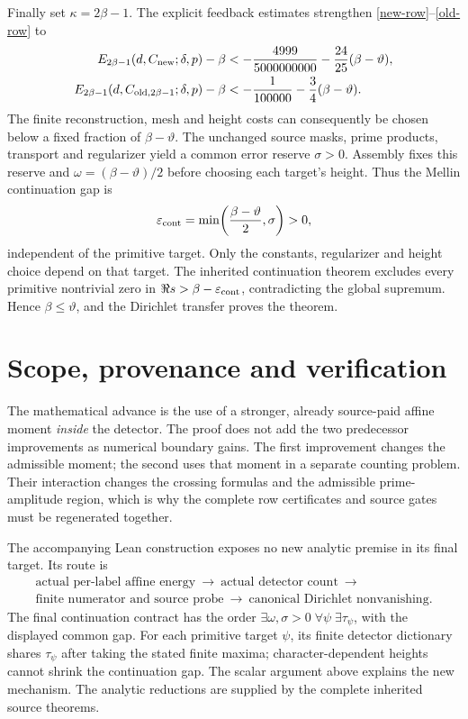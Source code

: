 \documentclass[10pt,a4paper]{article}
\newcommand{\tht}{\vartheta}
\begin{document}
Finally set $\kappa=2\beta-1$. The explicit feedback estimates strengthen
\eqref{new-row}--\eqref{old-row} to
\begin{align*}
 E_{2\beta-1}(d,C_{\rm new};\delta,p)-\beta
 &<-\frac{4999}{5000000000}-\frac{24}{25}(\beta-\tht),\\
 E_{2\beta-1}(d,C_{{\rm old},2\beta-1};\delta,p)-\beta
 &<-\frac1{100000}-\frac34(\beta-\tht).
\end{align*}
The finite reconstruction, mesh and height costs can consequently be
chosen below a fixed fraction of $\beta-\tht$. The unchanged source masks,
prime products, transport and regularizer yield a common error reserve
$\sigma>0$. Assembly fixes this reserve and $\omega=(\beta-\tht)/2$
before choosing each target's height. Thus the Mellin continuation gap is
\[
 \varepsilon_{\rm cont}=\min\!\left(\frac{\beta-\tht}{2},\sigma\right)>0,
\]
independent of the primitive target. Only the constants, regularizer and
height choice depend on that target. The inherited continuation theorem
excludes every primitive nontrivial zero in
$\Re s>\beta-\varepsilon_{\rm cont}$, contradicting the global supremum.
Hence $\beta\leq\tht$, and the Dirichlet transfer proves the theorem.

\section{Scope, provenance and verification}
The mathematical advance is the use of a stronger, already source-paid
affine moment \emph{inside} the detector. The proof does not add the two
predecessor improvements as numerical boundary gains. The first improvement
changes the admissible moment; the second uses that moment in a separate
counting problem. Their interaction changes the crossing formulas and the
admissible prime-amplitude region, which is why the complete row
certificates and source gates must be regenerated together.

The accompanying Lean construction exposes no new analytic premise in its
final target. Its route is
\begin{gather*}
 \text{actual per-label affine energy}\ \longrightarrow\
 \text{actual detector count}\ \longrightarrow\\
 \text{finite numerator and source probe}\ \longrightarrow\
 \text{canonical Dirichlet nonvanishing}.
\end{gather*}
The final continuation contract has the order
$\exists\omega,\sigma>0\;\forall\psi\;\exists\tau_\psi$,
with the displayed common gap. For each primitive target $\psi$, its finite
detector dictionary shares $\tau_\psi$ after taking the stated finite maxima;
character-dependent heights cannot shrink the continuation gap.
The scalar argument above explains the new mechanism. The analytic
reductions are supplied by the complete inherited source theorems.
\end{document}
